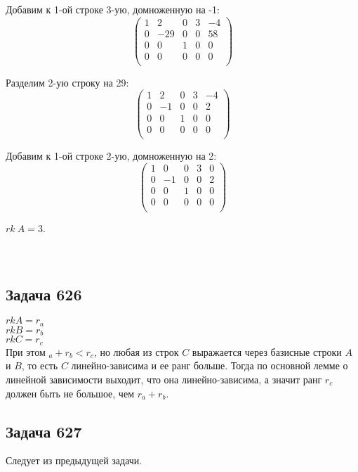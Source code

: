 	 Добавим к 1-ой строке 3-ую, домноженную на -1:
	 \[
	 \begin{pmatrix}
	 1 & 2 & 0 & 3 & -4 \\
	 0 & -29 & 0 & 0 & 58 \\
	 0 & 0 & 1 & 0 & 0 \\
	 0 & 0 & 0 & 0 & 0 \\
	 \end{pmatrix}
	 \]
	 
	 Разделим 2-ую строку на 29:
	 \[
	 \begin{pmatrix}
	 1 & 2 & 0 & 3 & -4 \\
	 0 & -1 & 0 & 0 & 2 \\
	 0 & 0 & 1 & 0 & 0 \\
	 0 & 0 & 0 & 0 & 0 \\
	 \end{pmatrix}
	 \]
	 
	 Добавим к 1-ой строке 2-ую, домноженную на 2:
	 \[
	 \begin{pmatrix}
	 1 & 0 & 0 & 3 & 0 \\
	 0 & -1 & 0 & 0 & 2 \\
	 0 & 0 & 1 & 0 & 0 \\
	 0 & 0 & 0 & 0 & 0 \\
	 \end{pmatrix}
	 \]
	 
	 $rk\ A = 3$.\\\\\\
	 
	 \subsection{Задача 626}
	 $rk A = r_a$ \\
	 $rk B = r_b$ \\
	 $rk C = r_c$ \\
	 При этом $_a + r_b < r_c$, но любая из строк $C$ выражается через базисные строки $A$ и $B$, то есть $C$ линейно-зависима и ее ранг больше. Тогда по основной лемме о линейной зависимости выходит, что она линейно-зависима, а значит ранг $r_c$ должен быть не большое, чем $r_a + r_b$.
	 
	 \subsection{Задача 627}
	 Следует из предыдущей задачи.
	
	